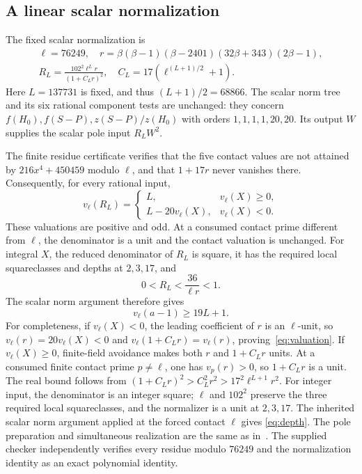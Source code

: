 \documentclass[11pt,a4paper]{article}
\begin{document}
\subsection{A linear scalar normalization}

The fixed scalar normalization is
\begin{equation}\label{eq:normalizer}
 \begin{gathered}
 \ell=76249,\quad
 r=\beta(\beta-1)(\beta-2401)(32\beta+343)(2\beta-1),\\
 R_L=\frac{102^2\ell^L r}{(1+C_Lr)^2},\quad
 C_L=17(\ell^{(L+1)/2}+1).
 \end{gathered}
\end{equation}
Here $L=137731$ is fixed, and thus $(L+1)/2=68866$. The scalar norm tree and its six rational
component tests are unchanged: they concern
$f(H_0),f(S-P),z(S-P)/z(H_0)$ with orders
$1,1,1,1,20,20$. Its output $W$ supplies the scalar pole
input $R_LW^2$.

The finite residue certificate verifies that the five contact
values are not attained by $216x^4+450459$ modulo $\ell$,
and that $1+17r$ never vanishes there. Consequently, for every
rational input,
\begin{equation}\label{eq:valuation}
 v_\ell(R_L)=
 \begin{cases}
 L,&v_\ell(X)\ge0,\\
 L-20v_\ell(X),&v_\ell(X)<0.
 \end{cases}
\end{equation}
These valuations are positive and odd. At a consumed contact
prime different from $\ell$, the denominator is a unit and the
contact valuation is unchanged. For integral $X$, the reduced
denominator of $R_L$ is square, it has the required local
squareclasses and depths at $2,3,17$, and
\[
 0<R_L<\frac{36}{\ell r}<1.
\]
The scalar norm argument therefore gives
\begin{equation}\label{eq:depth}
 v_\ell(a-1)\ge19L+1.
\end{equation}
For completeness, if $v_\ell(X)<0$, the leading coefficient of
$r$ is an $\ell$-unit, so $v_\ell(r)=20v_\ell(X)<0$ and
$v_\ell(1+C_Lr)=v_\ell(r)$, proving~\eqref{eq:valuation}.
If $v_\ell(X)\ge0$, finite-field avoidance makes both $r$
and $1+C_Lr$ units. At a consumed finite contact prime
$p\ne\ell$, one has $v_p(r)>0$, so $1+C_Lr$ is a unit.
The real bound follows from
$(1+C_Lr)^2>C_L^2r^2>17^2\ell^{L+1}r^2$.
For integer input, the denominator is an integer square;
$\ell$ and $102^2$ preserve the three required local squareclasses,
and the normalizer is a unit at $2,3,17$. The inherited scalar
norm argument applied at the forced contact $\ell$ gives
\eqref{eq:depth}. The pole preparation and simultaneous realization
are the same as in~\cite{Baseline}. The supplied
checker independently verifies every residue modulo $76249$
and the normalization identity as an exact polynomial identity.
\end{document}
